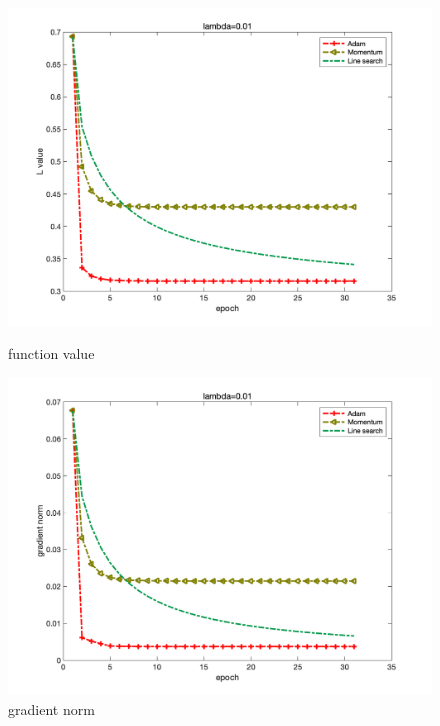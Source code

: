 \documentclass{article}
\begin{document}
\begin{figure}[H]
	\begin{minipage}{0.33\linewidth}
		\centering
		\includegraphics[width=1\linewidth]{./fig/fval_m4}
		\caption{function value}
	\end{minipage}
	\begin{minipage}{0.33\linewidth}
		\centering
		\includegraphics[width=1\linewidth]{./fig/gnorm_m4}
		\caption{gradient norm}
	\end{minipage}
	\begin{minipage}{0.33\linewidth}
		\centering

\end{minipage}
\end{figure}
\end{document}
